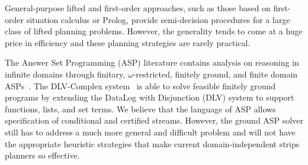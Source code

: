 \documentclass[letterpaper]{article} %
\theoremstyle{plain}\newtheorem{thm}{Theorem}
\theoremstyle{definition}\newtheorem{defn}{Definition}
\theoremstyle{plain}\newtheorem{lem}{Lemma}
\theoremstyle{plain}\newtheorem{cor}{Corollary}
\newcommand{\strips}{{\sc strips}}
\begin{document}
General-purpose lifted and first-order approaches, such as
those based on first-order situation calculus or Prolog, provide
semi-decision procedures for a large class of lifted planning
problems.  However, the generality tends to come at a huge price in
efficiency and these planning strategies are rarely practical. %




The Answer Set Programming (ASP) literature contains analysis on reasoning in infinite domains through finitary, $\omega$-restricted, finitely ground, and finite domain ASPs~\cite{bonatti2010answer}. 
The DLV-Complex system~\cite{calimeri2009asp} is able to solve feasible finitely ground programs by extending the DataLog with Disjunction (DLV) system to support functions, lists, and set terms.
We believe %
that the language of ASP allows specification of
conditional and certified streams.  
However, the ground ASP solver
still has to address a much more general and difficult problem and
will not have the appropriate heuristic strategies that make current
domain-independent \strips{} planners so effective. %
\end{document}
